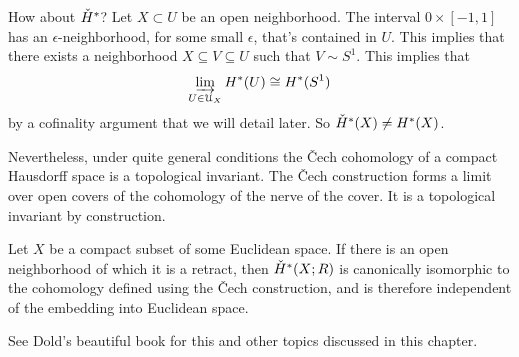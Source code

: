 How about $\check{H}^\ast$? Let $X\subset U$ be an open neighborhood. The interval
$0\times[-1,1]$
has an $\epsilon$-neighborhood, for some small $\epsilon$, that's contained in $U$. This implies that there exists a neighborhood $X\subseteq V\subseteq U$ such that $V\sim S^1$. This implies that 
\[
\varinjlim_{U\in\mathcal{U}_X}H^\ast(U)\cong H^\ast(S^1)
\]
by a cofinality argument that we will detail later. So $\check{H}^\ast(X)\neq H^\ast(X)$.

Nevertheless, under quite general conditions the \v{C}ech cohomology of a compact Hausdorff space is a topological invariant. The \v{C}ech construction forms
a limit over open covers of the cohomology of the nerve of the cover. It is
a topological invariant by construction. 

\begin{theorem} Let $X$ be a compact subset of some Euclidean space. If there
is an open neighborhood of which it is a retract, then $\check{H}^*(X;R)$ is 
canonically isomorphic to the cohomology defined using the \v{C}ech 
construction, and is therefore independent of the embedding into Euclidean
space. 
\end{theorem}

See Dold's beautiful book \cite{dold} for this and other topics discussed
in this chapter. 
